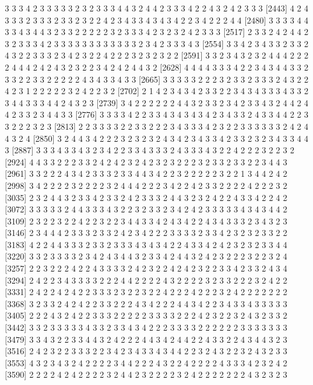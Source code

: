 \begin{Schunk}
\begin{Soutput}
[2406] 3 3 3 4 2 3 3 3 3 3 2 3 2 3 3 3 4 4 3 2 4 4 2 3 3 3 4 2 2 4 3 2 4 2 3 3 3
[2443] 4 2 4 3 3 3 2 3 3 3 2 3 3 2 3 2 2 4 2 3 4 3 3 4 3 4 3 4 2 2 3 4 2 2 2 4 4
[2480] 3 3 3 3 4 4 3 3 4 3 4 4 3 2 3 3 2 2 2 2 2 3 2 3 3 3 4 2 3 2 3 2 4 2 3 3 3
[2517] 2 3 3 2 4 2 4 4 2 3 2 3 3 3 4 2 3 3 3 3 3 3 3 3 3 3 3 3 2 3 4 2 3 3 3 4 3
[2554] 3 3 4 2 3 4 3 3 2 3 3 2 4 3 2 2 3 3 3 2 3 4 2 3 2 2 4 2 2 2 3 2 3 2 3 2 2
[2591] 3 3 2 3 4 3 2 3 2 4 4 4 2 2 2 2 4 4 4 2 4 2 4 3 2 3 2 2 3 4 2 4 2 4 4 3 2
[2628] 4 4 4 4 3 3 3 4 2 2 3 4 3 4 4 3 3 2 3 3 2 2 3 3 2 2 2 2 2 4 3 4 3 3 4 3 3
[2665] 3 3 3 3 3 2 2 2 3 2 3 3 2 3 3 3 2 4 3 2 2 4 2 3 1 2 2 2 2 2 3 2 4 2 2 3 2
[2702] 2 1 4 2 3 4 3 4 2 3 3 2 2 3 4 3 4 3 3 3 4 3 3 2 3 4 4 3 3 3 4 4 2 4 3 2 3
[2739] 3 4 2 2 2 2 2 2 4 4 3 2 3 3 2 3 4 2 3 3 4 3 2 4 4 2 4 4 2 3 3 2 3 4 4 3 3
[2776] 3 3 3 3 4 2 2 3 3 4 3 4 3 4 3 4 2 3 4 3 3 2 4 3 3 4 4 2 2 3 3 2 2 2 3 2 3
[2813] 2 2 3 3 3 3 2 2 3 3 2 2 2 3 4 3 3 3 4 2 3 2 2 3 3 3 3 3 3 2 4 2 4 4 3 2 4
[2850] 3 2 4 4 3 4 2 2 2 3 2 3 2 3 2 4 3 4 2 3 4 3 3 4 2 3 3 2 3 2 3 4 3 3 4 4 3
[2887] 3 3 3 4 3 3 4 3 2 3 4 2 2 3 3 4 3 3 3 2 4 3 3 3 4 3 2 2 4 2 2 2 3 2 2 3 2
[2924] 4 4 3 3 2 2 2 3 3 2 4 2 4 2 3 2 4 2 3 2 3 2 2 2 3 2 3 3 2 3 3 2 2 3 4 4 3
[2961] 3 3 2 2 2 4 3 4 2 3 3 3 2 3 3 4 4 3 4 2 2 3 2 2 2 2 2 3 2 2 1 3 4 4 2 4 2
[2998] 3 4 2 2 2 2 3 2 2 2 2 3 2 4 4 4 2 2 2 3 4 2 2 4 2 3 3 2 2 2 2 4 2 2 2 3 2
[3035] 2 3 2 4 4 3 2 3 3 4 2 3 3 2 4 2 3 3 3 2 4 4 3 2 3 2 4 2 2 4 3 3 4 2 2 4 2
[3072] 3 3 3 3 3 2 4 4 3 3 3 4 3 2 2 3 2 3 3 2 3 4 2 4 2 3 3 3 3 3 4 3 4 3 4 4 2
[3109] 2 3 2 2 3 2 2 4 2 2 3 2 2 3 4 4 3 3 4 2 4 3 4 2 2 4 3 4 3 3 3 2 3 4 3 2 3
[3146] 2 3 4 4 4 2 3 3 3 2 3 3 2 4 2 3 4 2 2 2 3 3 3 3 2 3 3 4 2 3 2 3 2 3 3 2 2
[3183] 4 2 2 4 4 3 3 3 2 3 3 2 3 3 3 4 3 4 3 4 2 2 4 3 3 4 2 4 2 3 2 3 2 3 3 4 4
[3220] 3 3 2 3 3 3 3 2 3 4 2 4 3 4 4 3 2 3 3 4 2 4 4 3 2 4 2 3 2 2 2 3 2 2 3 2 4
[3257] 2 2 3 2 2 2 4 2 2 4 3 3 3 3 2 4 2 3 2 2 4 2 4 2 3 2 2 3 3 4 2 3 3 2 4 3 4
[3294] 2 4 2 2 3 4 3 3 3 3 2 2 2 4 4 2 2 2 2 4 3 2 2 2 2 3 2 3 3 2 2 2 3 2 4 2 2
[3331] 2 4 2 2 4 2 4 2 2 3 3 3 2 3 2 2 3 2 2 4 2 2 2 4 2 2 2 3 2 4 2 2 2 2 2 2 2
[3368] 3 2 3 3 2 4 2 4 2 2 3 3 2 2 2 4 3 4 2 2 2 4 4 3 4 2 2 3 4 3 3 4 3 3 3 3 3
[3405] 2 2 2 4 3 2 4 2 2 3 3 3 2 2 2 2 2 3 3 3 3 2 2 2 4 2 3 2 2 3 2 4 3 2 3 3 2
[3442] 3 3 2 3 3 3 3 3 4 3 3 2 3 3 4 3 4 2 2 2 3 3 3 3 2 2 2 2 2 2 3 3 3 3 3 3 3
[3479] 3 3 4 3 2 2 3 3 4 4 3 2 4 2 2 2 4 4 3 4 2 4 4 2 2 4 3 3 2 2 4 3 4 4 3 2 3
[3516] 2 4 2 3 2 2 3 3 3 2 2 3 4 2 3 4 3 3 4 3 4 4 2 2 3 2 4 3 2 2 3 2 4 3 2 3 3
[3553] 4 3 2 3 4 3 2 4 2 2 2 2 3 4 4 2 2 2 4 3 2 2 4 2 2 2 2 4 3 3 3 4 2 3 2 4 2
[3590] 2 2 2 2 4 2 4 2 2 2 2 3 2 4 4 2 3 2 2 2 2 3 2 4 2 2 2 2 2 2 2 4 3 2 3 2 3

\end{Soutput}
\end{Schunk}

